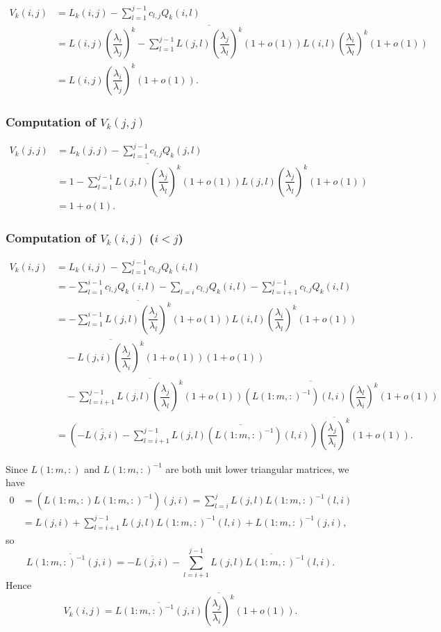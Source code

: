 \documentclass[11pt,a4paper]{article}
\theoremstyle{plain}              %
\theoremstyle{definition}         %
\begin{document}
\begin{align*}
V_k(i,j)&=L_k(i,j)-\sum_{l=1}^{j-1}c_{l,j}Q_k(i,l)\\
&=L(i,j)\left(\dfrac{\lambda_i}{\lambda_j}\right)^k-\sum_{l=1}^{j-1}\overline{L(j,l)\left(\dfrac{\lambda_j}{\lambda_l}\right)^k}(1+o(1))L(i,l)\left(\dfrac{\lambda_i}{\lambda_l}\right)^k(1+o(1))\\
&=L(i,j)\left(\dfrac{\lambda_i}{\lambda_j}\right)^k(1+o(1)).
\end{align*}

\subsubsection{Computation of \(V_k(j,j)\)}

\begin{align*}
V_k(j,j)&=L_k(j,j)-\sum_{l=1}^{j-1}c_{l,j}Q_k(j,l)\\
&=1-\sum_{l=1}^{j-1}\overline{L(j,l)\left(\dfrac{\lambda_j}{\lambda_l}\right)^k}(1+o(1))L(j,l)\left(\dfrac{\lambda_j}{\lambda_l}\right)^k(1+o(1))\\
&=1+o(1).
\end{align*}

\subsubsection{Computation of \(V_k(i,j)\) (\(i<j\))}

\begin{align*}
V_k(i,j)&=L_k(i,j)-\sum_{l=1}^{j-1}c_{l,j}Q_k(i,l)\\
&=-\sum_{l=1}^{i-1}c_{l,j}Q_k(i,l)-\sum_{l=i}c_{l,j}Q_k(i,l)-\sum_{l=i+1}^{j-1}c_{l,j}Q_k(i,l)\\
&=-\sum_{l=1}^{i-1}\overline{L(j,l)\left(\dfrac{\lambda_j}{\lambda_l}\right)^k}(1+o(1))L(i,l)\left(\dfrac{\lambda_i}{\lambda_l}\right)^k(1+o(1))\\
&\quad-\overline{L(j,i)\left(\dfrac{\lambda_j}{\lambda_i}\right)^k}(1+o(1))(1+o(1))\\
&\quad-\sum_{l=i+1}^{j-1}\overline{L(j,l)\left(\dfrac{\lambda_j}{\lambda_l}\right)^k}(1+o(1))\overline{(L(1:m,:)^{-1})(l,i)\left(\dfrac{\lambda_l}{\lambda_i}\right)^k}(1+o(1))\\
&=\left(-\overline{L(j,i)}-\sum_{l=i+1}^{j-1}\overline{L(j,l)(L(1:m,:)^{-1})(l,i)}\right)\overline{\left(\dfrac{\lambda_j}{\lambda_i}\right)^k}(1+o(1)).
\end{align*}

Since \(L(1:m,:)\) and \(L(1:m,:)^{-1}\) are both unit lower triangular matrices, we have
\begin{align*}
0&=(L(1:m,:)L(1:m,:)^{-1})(j,i)=\sum_{l=i}^{j}L(j,l)L(1:m,:)^{-1}(l,i)\\
&=L(j,i)+\sum_{l=i+1}^{j-1}L(j,l)L(1:m,:)^{-1}(l,i)+L(1:m,:)^{-1}(j,i),
\end{align*}
so
\[
\overline{L(1:m,:)^{-1}(j,i)}=-\overline{L(j,i)}-\sum_{l=i+1}^{j-1}\overline{L(j,l)L(1:m,:)^{-1}(l,i)}.
\]
Hence
\[
V_k(i,j)=\overline{L(1:m,:)^{-1}(j,i)}\overline{\left(\dfrac{\lambda_j}{\lambda_i}\right)^k}(1+o(1)).
\]
\end{document}
